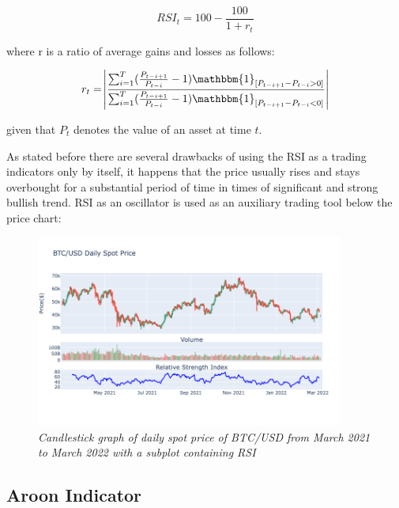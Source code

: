 \begin{equation}
RSI_t = 100- \frac{100}{1+r_t} 
\end{equation}
 
 where r is a ratio of average gains and losses as follows:
 
\begin{equation}
 r_t = \abs{\frac{\sum_{i=1}^{T}(\frac{P_{t-i+1}}{P_{t-i}}-1)\mathbbm{1}_{[P_{t-i+1} - P_{t-i} > 0]}}{\sum_{i=1}^{T}(\frac{P_{t-i+1}}{P_{t-i}}-1) \mathbbm{1}_{[P_{t-i+1} - P_{t-i} < 0]}}}
\end{equation}

given that $P_t$ denotes the value of an asset at time $t$.

As stated before there are several drawbacks of using the RSI as a trading indicators only by itself, it happens that the price usually rises and stays overbought for a substantial period of time in times of significant and strong bullish trend. RSI as an oscillator is used as an auxiliary trading tool below the price chart:

\begin{figure}[ht]

\begin{center}
	\includegraphics[width=0.9\textwidth]{Figs/RSI.png}
\end{center}

\caption{\textit{ Candlestick graph of daily spot price of BTC/USD from March 2021 to March 2022 with a subplot containing  RSI}}

\end{figure}

\subsection{Aroon Indicator}

